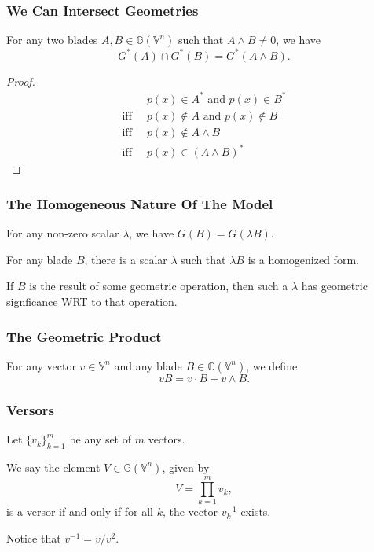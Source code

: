 \documentclass{beamer}
\newcommand{\G}{\mathbb{G}}
\newcommand{\V}{\mathbb{V}}
\begin{document}
\begin{frame}
\frametitle{We Can Intersect Geometries}
For any two blades $A,B\in\G(\V^n)$ such that $A\wedge B\neq 0$,
we have
\begin{equation*}
G^*(A)\cap G^*(B)=G^*(A\wedge B).
\end{equation*}\pause
\begin{proof}
\begin{align*}
 & \mbox{$p(x)\in A^*$ and $p(x)\in B^*$} \\
\mbox{iff}\;\; & \mbox{$p(x)\not\in A$ and $p(x)\not\in B$} \\
\mbox{iff}\;\; & \mbox{$p(x)\not\in A\wedge B$} \\
\mbox{iff}\;\; & \mbox{$p(x)\in(A\wedge B)^*$}
\end{align*}
\end{proof}
\end{frame}

\begin{frame}
\frametitle{The Homogeneous Nature Of The Model}
For any non-zero scalar $\lambda$, we have $G(B)=G(\lambda B)$.\pause

For any blade $B$, there is a scalar $\lambda$ such that $\lambda B$ is a homogenized form.\pause

If $B$ is the result of some geometric operation, then such a $\lambda$ has geometric signficance
WRT to that operation.
\end{frame}

\begin{frame}
\frametitle{The Geometric Product}
\begin{definition}
For any vector $v\in\V^n$ and any blade $B\in\G(\V^n)$, we define
\begin{equation*}
vB = v\cdot B + v\wedge B.
\end{equation*}
\end{definition}
\end{frame}

\begin{frame}
\frametitle{Versors}
Let $\{v_k\}_{k=1}^m$ be any set of $m$ vectors.\pause
\begin{definition}
We say the element $V\in\G(\V^n)$, given by
\begin{equation*}
V = \prod_{k=1}^m v_k,
\end{equation*}
is a versor if and only if for all $k$, the vector $v_k^{-1}$ exists.
\end{definition}\pause
Notice that $v^{-1}=v/v^2$.
\end{frame}
\end{document}
